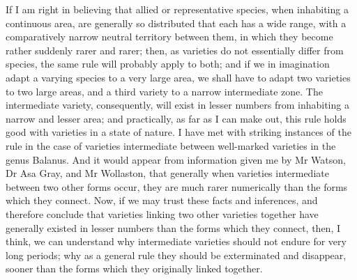 \indent If I am right in believing that allied or representative species, when inhabiting a continuous area, are generally so distributed that each has a wide range, with a comparatively narrow neutral territory between them, in which they become rather suddenly rarer and rarer; then, as varieties do not essentially differ from species, the same rule will probably apply to both; and if we in imagination adapt a varying species to a very large area, we shall have to adapt two varieties to two large areas, and a third variety to a narrow intermediate zone. The intermediate variety, consequently, will exist in lesser numbers from inhabiting a narrow and lesser area; and practically, as far as I can make out, this rule holds good with varieties in a state of nature. I have met with striking instances of the rule in the case of varieties intermediate between well-marked varieties in the genus Balanus. And it would appear from information given me by Mr Watson, Dr Asa Gray, and Mr Wollaston, that generally when varieties intermediate between two other forms occur, they are much rarer numerically than the forms which they connect. Now, if we may trust these facts and inferences, and therefore conclude that varieties linking two other varieties together have generally existed in lesser numbers than the forms which they connect, then, I think, we can understand why intermediate varieties should not endure for very long periods; why as a general rule they should be exterminated and disappear, sooner than the forms which they originally linked together.\\
